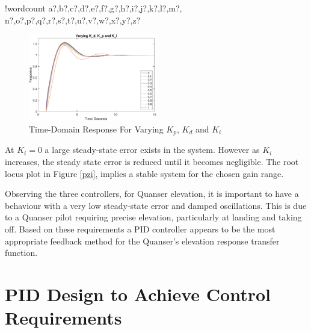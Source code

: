 \documentclass[11pt]{article}
\newcounter{words}
\newenvironment{counted}{%
  \setcounter{words}{0}
  \SearchList!{wordcount}{\stepcounter{words}}
    {a?,b?,c?,d?,e?,f?,g?,h?,i?,j?,k?,l?,m?,
    n?,o?,p?,q?,r?,s?,t?,u?,v?,w?,x?,y?,z?}
  \UndoBoundary{'}
  \SearchOrder{p;}}{%
  \StopSearching}
\begin{document}
\begin{counted}
\begin{figure}
\centering
\vspace{-5pt} %
\includegraphics[trim = 0 0 0 0, clip, width=0.5\textwidth]{vkpvkdvki.eps}
\vspace{-10pt}
\caption{Time-Domain Response For Varying $K_p$, $K_d$ and $K_i$}
  \label{vkpvkdvki}
\vspace{-35pt}
\end{figure}

At \(K_i = 0\) a large steady-state error exists in the system. However
as \(K_i\) increases, the steady state error is reduced until it becomes
negligible. The root locus plot in Figure \ref{pzi}, implies a stable
system for the chosen gain range.

Observing the three controllers, for Quanser elevation, it is important
to have a behaviour with a very low steady-state error and damped
oscillations. This is due to a Quanser pilot requiring precise
elevation, particularly at landing and taking off. Based on these
requirements a PID controller appears to be the most appropriate
feedback method for the Quanser's elevation response transfer function.

\section{PID Design to Achieve Control
Requirements}\label{pid-design-to-achieve-control-requirements}


\end{counted}
\end{document}
